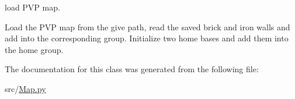 load P\+VP map. 

Load the P\+VP map from the give path, read the saved brick and iron walls and add into the corresponding group. Initialize two home bases and add them into the home group. 

The documentation for this class was generated from the following file\+:\begin{DoxyCompactItemize}
\item 
src/\mbox{\hyperlink{_map_8py}{Map.\+py}}\end{DoxyCompactItemize}
